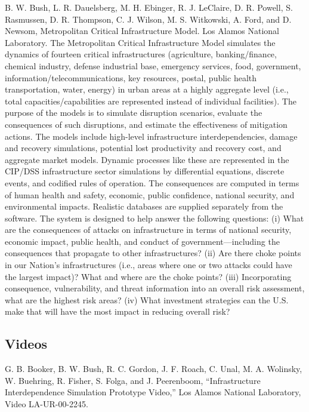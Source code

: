 \documentclass[]{article}
\begin{document}
B. W. Bush, L. R. Dauelsberg, M. H. Ebinger, R. J. LeClaire, D. R.
Powell, S. Rasmussen, D. R. Thompson, C. J. Wilson, M. S. Witkowski, A.
Ford, and D. Newsom, Metropolitan Critical Infrastructure Model. Los
Alamos National Laboratory. The Metropolitan Critical Infrastructure
Model simulates the dynamics of fourteen critical infrastructures
(agriculture, banking/finance, chemical industry, defense industrial
base, emergency services, food, government,
information/telecommunications, key resources, postal, public health
transportation, water, energy) in urban areas at a highly aggregate
level (i.e., total capacities/capabilities are represented instead of
individual facilities). The purpose of the models is to simulate
disruption scenarios, evaluate the consequences of such disruptions, and
estimate the effectiveness of mitigation actions. The models include
high-level infrastructure interdependencies, damage and recovery
simulations, potential lost productivity and recovery cost, and
aggregate market models. Dynamic processes like these are represented in
the CIP/DSS infrastructure sector simulations by differential equations,
discrete events, and codified rules of operation. The consequences are
computed in terms of human health and safety, economic, public
confidence, national security, and environmental impacts. Realistic
databases are supplied separately from the software. The system is
designed to help answer the following questions: (i) What are the
consequences of attacks on infrastructure in terms of national security,
economic impact, public health, and conduct of government---including
the consequences that propagate to other infrastructures? (ii) Are there
choke points in our Nation's infrastructures (i.e., areas where one or
two attacks could have the largest impact)? What and where are the choke
points? (iii) Incorporating consequence, vulnerability, and threat
information into an overall risk assessment, what are the highest risk
areas? (iv) What investment strategies can the U.S. make that will have
the most impact in reducing overall risk?

\subsection{Videos}\label{videos}

G. B. Booker, B. W. Bush, R. C. Gordon, J. F. Roach, C. Unal, M. A.
Wolinsky, W. Buehring, R. Fisher, S. Folga, and J. Peerenboom,
``Infrastructure Interdependence Simulation Prototype Video,'' Los
Alamos National Laboratory, Video LA-UR-00-2245.
\end{document}
